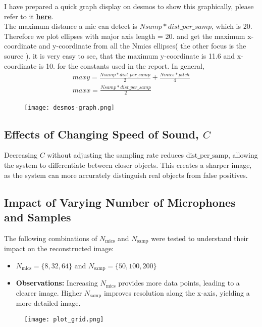\documentclass{article}
\begin{document}
I have prepared a quick graph display on desmos to show this graphically, 
please refer to it \href{https://www.desmos.com/calculator/zar4naicoh}{\textbf{here}}.\\ 
The maximum distance a mic can detect is $Nsamp * dist\_per\_samp$, which is 20. Therefore we plot
ellipses with major axis length = 20. and get the maximum x-coordinate and y-coordinate from all the
Nmics ellipses( the other focus is the source ).
it is very easy to see, that the maximum y-coordinate is 11.6 and x-coordinate is 10. for the constants used 
in the report. In general,
   \begin{gather}
	   maxy = \frac{Nsamp * dist\_per\_samp}{2} + \frac{Nmics * pitch}{4}\\
	   maxx = \frac{Nsamp * dist\_per\_samp}{2}
   \end{gather}
\begin{figure}[!h]
	\centering
	\texttt{[image: desmos-graph.png]}
\end{figure}

\FloatBarrier

\subsection{Effects of Changing Speed of Sound, $C$}
Decreasing $C$ without adjusting the sampling rate reduces $\text{dist\_per\_samp}$, allowing the system to differentiate between closer objects. This creates a sharper image, as the system can more accurately distinguish real objects from false positives.

\subsection{Impact of Varying Number of Microphones and Samples}
The following combinations of $N_{\text{mics}}$ and $N_{\text{samp}}$ were tested to understand their impact on the reconstructed image:
\begin{itemize}
    \item $N_{\text{mics}} = \{8, 32, 64\}$ and $N_{\text{samp}} = \{50, 100, 200\}$
    \item \textbf{Observations:} Increasing $N_{\text{mics}}$ provides more data points, leading to a clearer image. Higher $N_{\text{samp}}$ improves resolution along the x-axis, yielding a more detailed image.
\end{itemize}

\begin{figure}[!h]
	\centering
	\texttt{[image: plot\_grid.png]}
\end{figure}
\end{document}
